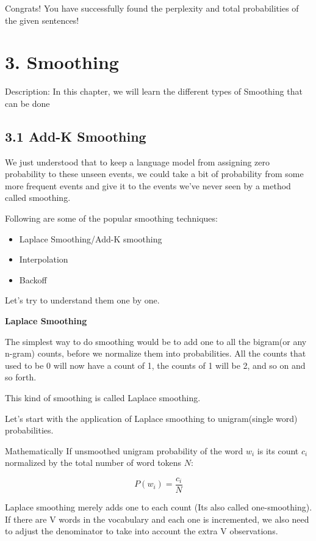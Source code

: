 \documentclass[11pt]{article}
\begin{document}
Congrats! You have successfully found the perplexity and total
probabilities of the given sentences!

    \hypertarget{smoothing}{%
\section{3. Smoothing}\label{smoothing}}

Description: In this chapter, we will learn the different types of
Smoothing that can be done

    \hypertarget{add-k-smoothing}{%
\subsection{3.1 Add-K Smoothing}\label{add-k-smoothing}}

    We just understood that to keep a language model from assigning zero
probability to these unseen events, we could take a bit of probability
from some more frequent events and give it to the events we've never
seen by a method called smoothing.

Following are some of the popular smoothing techniques:

\begin{itemize}
\item
  Laplace Smoothing/Add-K smoothing
\item
  Interpolation
\item
  Backoff
\end{itemize}

Let's try to understand them one by one.

\textbf{Laplace Smoothing}

The simplest way to do smoothing would be to add one to all the
bigram(or any n-gram) counts, before we normalize them into
probabilities. All the counts that used to be 0 will now have a count of
1, the counts of 1 will be 2, and so on and so forth.

This kind of smoothing is called Laplace smoothing.

Let's start with the application of Laplace smoothing to unigram(single
word) probabilities.

Mathematically If unsmoothed unigram probability of the word \(w_i\) is
its count \(c_i\) normalized by the total number of word tokens \(N\):

\[P(w_i) = \frac{c_i}{N}\]

Laplace smoothing merely adds one to each count (Its also called
one-smoothing). If there are V words in the vocabulary and each one is
incremented, we also need to adjust the denominator to take into account
the extra V observations.
\end{document}
